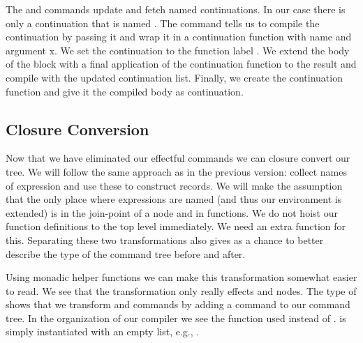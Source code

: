 The  and  commands update and fetch named continuations. In our case there is only a continuation that is named . The  command tells us to compile the continuation  by passing it  and wrap it in a continuation function with name  and argument {x}. We set the continuation  to the function label . We extend the body of the block with a final application of the continuation function  to the result  and compile with the updated continuation list. Finally, we create the continuation function and give it the compiled body  as continuation.

\subsection{\label{subsection:closconvert2}Closure Conversion}
Now that we have eliminated our effectful commands we can closure convert our tree. We will follow the same approach as in the previous version: collect names of expression and use these to construct records. We will make the assumption that the only place where expressions are named (and thus our environment is extended) is in the join-point of a node and in functions. We do not hoist our function definitions to the top level immediately. We need an extra function for this. Separating these two transformations also gives as a chance to better describe the type of the command tree before and after.

Using monadic helper functions we can make this transformation somewhat easier to read. We see that the transformation only really effects  and  nodes. The type of  shows that we transform  and  commands by adding a  command to our command tree. In the organization of our compiler we see the function  used instead of .  is simply  instantiated with an empty list, e.g., .

